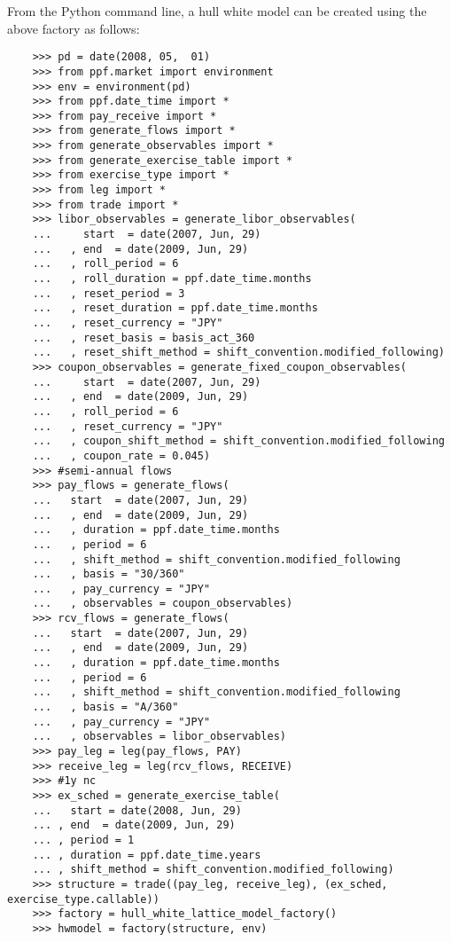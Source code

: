 From the Python command line, a hull white model can be created using
the above factory as follows:
\begin{verbatim}
    >>> pd = date(2008, 05,  01)
    >>> from ppf.market import environment
    >>> env = environment(pd)
    >>> from ppf.date_time import *
    >>> from pay_receive import *
    >>> from generate_flows import *
    >>> from generate_observables import *
    >>> from generate_exercise_table import *
    >>> from exercise_type import *
    >>> from leg import *
    >>> from trade import *
    >>> libor_observables = generate_libor_observables(
    ...     start  = date(2007, Jun, 29)
    ...   , end  = date(2009, Jun, 29)
    ...   , roll_period = 6
    ...   , roll_duration = ppf.date_time.months
    ...   , reset_period = 3
    ...   , reset_duration = ppf.date_time.months
    ...   , reset_currency = "JPY"
    ...   , reset_basis = basis_act_360
    ...   , reset_shift_method = shift_convention.modified_following)
    >>> coupon_observables = generate_fixed_coupon_observables(
    ...     start  = date(2007, Jun, 29)
    ...   , end  = date(2009, Jun, 29)
    ...   , roll_period = 6
    ...   , reset_currency = "JPY"
    ...   , coupon_shift_method = shift_convention.modified_following
    ...   , coupon_rate = 0.045)
    >>> #semi-annual flows
    >>> pay_flows = generate_flows(
    ...   start  = date(2007, Jun, 29)
    ...   , end  = date(2009, Jun, 29)
    ...   , duration = ppf.date_time.months
    ...   , period = 6
    ...   , shift_method = shift_convention.modified_following
    ...   , basis = "30/360"
    ...   , pay_currency = "JPY"
    ...   , observables = coupon_observables)
    >>> rcv_flows = generate_flows(
    ...   start  = date(2007, Jun, 29)
    ...   , end  = date(2009, Jun, 29)
    ...   , duration = ppf.date_time.months
    ...   , period = 6
    ...   , shift_method = shift_convention.modified_following
    ...   , basis = "A/360"
    ...   , pay_currency = "JPY"
    ...   , observables = libor_observables)
    >>> pay_leg = leg(pay_flows, PAY)
    >>> receive_leg = leg(rcv_flows, RECEIVE)
    >>> #1y nc
    >>> ex_sched = generate_exercise_table(
    ...   start = date(2008, Jun, 29)
    ... , end  = date(2009, Jun, 29)
    ... , period = 1
    ... , duration = ppf.date_time.years
    ... , shift_method = shift_convention.modified_following)
    >>> structure = trade((pay_leg, receive_leg), (ex_sched, exercise_type.callable))
    >>> factory = hull_white_lattice_model_factory()
    >>> hwmodel = factory(structure, env)
\end{verbatim}

